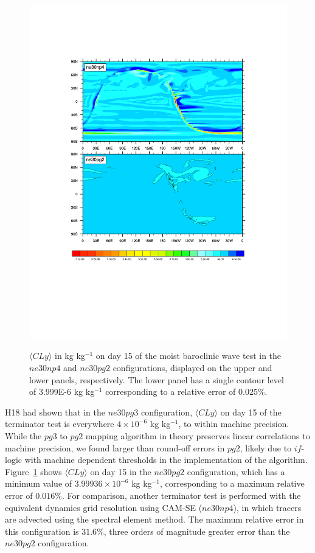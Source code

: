 \documentclass{agujournal}
\begin{document}
\begin{figure}[t]
\begin{center}
\noindent\includegraphics[width=30pc,angle=0]{temp_terminator.pdf}\\
\end{center}
\caption{$\langle CLy \rangle$ in kg kg$^{-1}$ on day 15 of the moist baroclinic wave test in the $ne30np4$ and $ne30pg2$ configurations, displayed on the upper and lower panels, respectively. The lower panel has a single contour level of 3.999E-6 kg kg$^{-1}$ corresponding to a relative error of $0.025\%$.}
\label{fig:terminator}
\end{figure}

H18 had shown that in the $ne30pg3$ configuration, $\langle CLy \rangle$ on day 15 of the terminator test is everywhere $4\times10^{-6}$ kg kg$^{-1}$, to within machine precision. While the $pg3$ to $pg2$ mapping algorithm in theory preserves linear correlations to machine precision, we found larger than round-off errors in $pg2$, likely due to $if$-logic with machine dependent thresholds in the implementation of the algorithm. Figure~\ref{fig:terminator} shows $\langle CLy \rangle$ on day 15 in the $ne30pg2$ configuration, which has a minimum value of $3.99936\times10^{-6}$ kg kg$^{-1}$, corresponding to a maximum relative error of $0.016\%$. For comparison, another terminator test is performed with the equivalent dynamics grid resolution using CAM-SE ($ne30np4$), in which tracers are advected using the spectral element method. The maximum relative error in this configuration is $31.6\%$, three orders of magnitude greater error than the $ne30pg2$ configuration.
\end{document}
